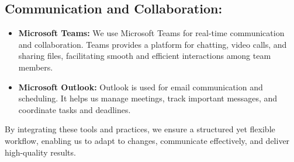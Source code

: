 \subsection{Communication and Collaboration:}

\begin{itemize}
\item  \textbf{Microsoft Teams: } We use Microsoft Teams for real-time communication and collaboration. 
Teams provides a platform for chatting, video calls, and sharing files, facilitating smooth and efficient 
interactions among team members.

\item  \textbf{Microsoft Outlook: } Outlook is used for email communication and scheduling. It helps us 
manage meetings, track important messages, and coordinate tasks and deadlines.
\end{itemize}

By integrating these tools and practices, we ensure a structured yet flexible workflow, enabling us to adapt to changes, communicate effectively, and deliver high-quality results.